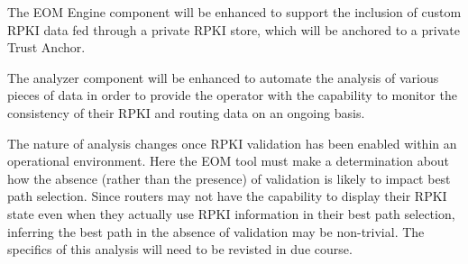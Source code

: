 The EOM Engine component will be enhanced to support the inclusion
of custom RPKI data fed through a private RPKI store, which will be
anchored to a private Trust Anchor. 

The analyzer component will be enhanced to automate the analysis of
various pieces of data in order to provide the operator with the
capability to monitor the consistency of their RPKI and routing data on
an ongoing basis. 

The nature of analysis changes once RPKI validation has been enabled
within an operational environment. Here the EOM tool must make a
determination about how the absence (rather than the presence) of
validation is likely to impact best path selection.
Since routers may not have the capability to display their RPKI
state even when they actually use RPKI information in their best path
selection, inferring the best path in the absence of validation may
be non-trivial. The specifics of this analysis will need to be
revisted in due course. 

%
%
%



